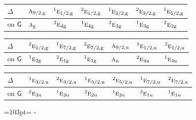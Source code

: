 \documentclass[10pt,a4paper]{article}
\newcommand{\needspace}[1]{\par\penalty-100\begingroup\dimen0=#1\relax\dimen2=\pagegoal
  \advance\dimen2-\pagetotal\ifdim\dimen0>\dimen2\relax\ifdim\dimen2>0pt\vfil\break\fi\fi
  \endgroup}
\numberwithin{equation}{section}
\newcommand{\grp}[1]{\mathsf{#1}}
\newcommand{\irr}[1]{\text{\normalfont\scshape #1}}
\newcommand{\conjpair}[1]{{}^{#1}}
\newcommand{\ptag}[1]{\mathrm{#1}}
\begin{document}
\begin{center}\begin{tabular}{@{}lllllll@{}}\toprule
$\Delta$ & $\irr{a}_{9/2,\ptag{g}}$ & $\conjpair{1}\irr{e}_{1/2,\ptag{g}}$ & $\conjpair{2}\irr{e}_{1/2,\ptag{g}}$ & $\conjpair{1}\irr{e}_{3/2,\ptag{g}}$ & $\conjpair{2}\irr{e}_{3/2,\ptag{g}}$ & $\conjpair{1}\irr{e}_{5/2,\ptag{g}}$\\\midrule
on $\grp{G}$ & $\irr{a}_{\ptag{g}}$ & $\conjpair{2}\irr{e}_{4\ptag{g}}$ & $\conjpair{1}\irr{e}_{4\ptag{g}}$ & $\conjpair{2}\irr{e}_{3\ptag{g}}$ & $\conjpair{1}\irr{e}_{3\ptag{g}}$ & $\conjpair{2}\irr{e}_{2\ptag{g}}$\\
\bottomrule\end{tabular}\end{center}
\begin{center}\begin{tabular}{@{}lllllll@{}}\toprule
$\Delta$ & $\conjpair{2}\irr{e}_{5/2,\ptag{g}}$ & $\conjpair{1}\irr{e}_{7/2,\ptag{g}}$ & $\conjpair{2}\irr{e}_{7/2,\ptag{g}}$ & $\irr{a}_{9/2,\ptag{u}}$ & $\conjpair{1}\irr{e}_{1/2,\ptag{u}}$ & $\conjpair{2}\irr{e}_{1/2,\ptag{u}}$\\\midrule
on $\grp{G}$ & $\conjpair{1}\irr{e}_{2\ptag{g}}$ & $\conjpair{2}\irr{e}_{1\ptag{g}}$ & $\conjpair{1}\irr{e}_{1\ptag{g}}$ & $\irr{a}_{\ptag{u}}$ & $\conjpair{2}\irr{e}_{4\ptag{u}}$ & $\conjpair{1}\irr{e}_{4\ptag{u}}$\\
\bottomrule\end{tabular}\end{center}
\begin{center}\begin{tabular}{@{}lllllll@{}}\toprule
$\Delta$ & $\conjpair{1}\irr{e}_{3/2,\ptag{u}}$ & $\conjpair{2}\irr{e}_{3/2,\ptag{u}}$ & $\conjpair{1}\irr{e}_{5/2,\ptag{u}}$ & $\conjpair{2}\irr{e}_{5/2,\ptag{u}}$ & $\conjpair{1}\irr{e}_{7/2,\ptag{u}}$ & $\conjpair{2}\irr{e}_{7/2,\ptag{u}}$\\\midrule
on $\grp{G}$ & $\conjpair{2}\irr{e}_{3\ptag{u}}$ & $\conjpair{1}\irr{e}_{3\ptag{u}}$ & $\conjpair{2}\irr{e}_{2\ptag{u}}$ & $\conjpair{1}\irr{e}_{2\ptag{u}}$ & $\conjpair{2}\irr{e}_{1\ptag{u}}$ & $\conjpair{1}\irr{e}_{1\ptag{u}}$\\
\bottomrule\end{tabular}\end{center}
\needspace{103pt}
\end{document}
